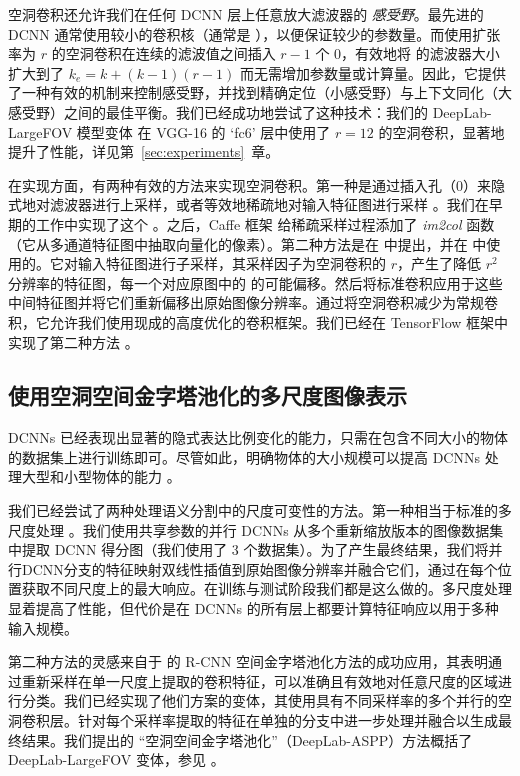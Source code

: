 空洞卷积还允许我们在任何 DCNN 层上任意放大滤波器的 \textit{感受野}。最先进的 DCNN 通常使用较小的卷积核（通常是 ），以便保证较少的参数量。而使用扩张率为 $r$ 的空洞卷积在连续的滤波值之间插入 $r-1$ 个 0，有效地将  的滤波器大小扩大到了 $k_e = k + (k-1)(r-1)$ 而无需增加参数量或计算量。因此，它提供了一种有效的机制来控制感受野，并找到精确定位（小感受野）与上下文同化（大感受野）之间的最佳平衡。我们已经成功地尝试了这种技术：我们的 DeepLab-LargeFOV 模型变体 \cite{chen2014semantic} 在 VGG-16 的 `fc6' 层中使用了 $r=12$ 的空洞卷积，显著地提升了性能，详见第~\ref{sec:experiments}~章。

在实现方面，有两种有效的方法来实现空洞卷积。第一种是通过插入孔（0）来隐式地对滤波器进行上采样，或者等效地稀疏地对输入特征图进行采样 \cite{holschneider1989real}。我们在早期的工作中实现了这个 \cite{papandreou2014untangling, chen2014semantic}。之后，Caffe 框架 \cite{jia2014caffe} 给稀疏采样过程添加了 \textsl{im2col} 函数（它从多通道特征图中抽取向量化的像素）\cite{yu2015multi}。第二种方法是在 \cite{shensa1992discrete} 中提出，并在 \cite{giusti2013fast, sermanet2013overfeat} 中使用的。它对输入特征图进行子采样，其采样因子为空洞卷积的 $r$，产生了降低 $r^2$ 分辨率的特征图，每一个对应原图中的  的可能偏移。然后将标准卷积应用于这些中间特征图并将它们重新偏移出原始图像分辨率。通过将空洞卷积减少为常规卷积，它允许我们使用现成的高度优化的卷积框架。我们已经在 TensorFlow 框架中实现了第二种方法 \cite{abadi2016tensorflow}。

\subsection{使用空洞空间金字塔池化的多尺度图像表示}

DCNNs 已经表现出显著的隐式表达比例变化的能力，只需在包含不同大小的物体的数据集上进行训练即可。尽管如此，明确物体的大小规模可以提高 DCNNs 处理大型和小型物体的能力 \cite{papandreou2014untangling}。

我们已经尝试了两种处理语义分割中的尺度可变性的方法。第一种相当于标准的多尺度处理 \cite{chen2015attention, kokkinos2016pushing}。我们使用共享参数的并行 DCNNs 从多个重新缩放版本的图像数据集中提取 DCNN 得分图（我们使用了 3 个数据集）。为了产生最终结果，我们将并行DCNN分支的特征映射双线性插值到原始图像分辨率并融合它们，通过在每个位置获取不同尺度上的最大响应。在训练与测试阶段我们都是这么做的。多尺度处理显着提高了性能，但代价是在 DCNNs 的所有层上都要计算特征响应以用于多种输入规模。

第二种方法的灵感来自于 \cite{he2014spatial} 的 R-CNN 空间金字塔池化方法的成功应用，其表明通过重新采样在单一尺度上提取的卷积特征，可以准确且有效地对任意尺度的区域进行分类。我们已经实现了他们方案的变体，其使用具有不同采样率的多个并行的空洞卷积层。针对每个采样率提取的特征在单独的分支中进一步处理并融合以生成最终结果。我们提出的 ``空洞空间金字塔池化''（DeepLab-ASPP）方法概括了 DeepLab-LargeFOV 变体，参见 。

